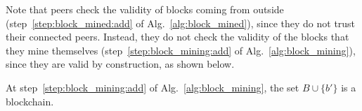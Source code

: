 Note that peers check the validity of blocks coming from outside
(step~\ref{step:block_mined:add} of Alg.~\ref{alg:block_mined}), since they do not trust
their connected peers. Instead, they do not check the validity of the blocks that they
mine themselves (step~\ref{step:block_mining:add} of Alg.~\ref{alg:block_mining}),
since they are valid by construction, as shown below.
%
\begin{proposition}\label{prop:mining_is_sound}
  At step~\ref{step:block_mining:add} of Alg.~\ref{alg:block_mining},
  the set $B\cup\{b'\}$ is a blockchain.
\end{proposition}
